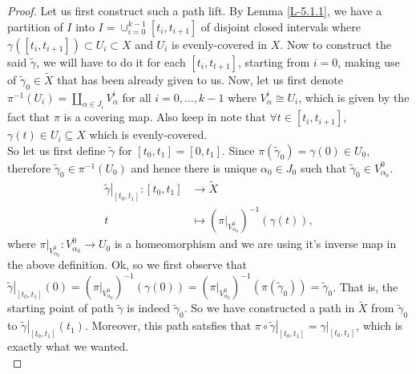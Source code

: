 \documentclass[letterpaper,11pt,twoside]{article}
\theoremstyle{definition}
\theoremstyle{definition}
\theoremstyle{definition}
\theoremstyle{definition}
\theoremstyle{definition}
\theoremstyle{definition}
\theoremstyle{remark}
\theoremstyle{definition}
\newcommand{\isom}{\cong}
\newcommand{\rest}[2]{\left. { #1 }\right \vert_{#2}}
\newcommand{\inv}[1]{\left(#1\right)^{-1}}
\begin{document}
\begin{proof}
Let us first construct such a path lift. By Lemma \ref{L-5.1.1}, we have a partition of $I$ into $I = \cup_{i=0}^{k-1} [t_i,t_{i+1}]$ of disjoint closed intervals where $\gamma ([t_i,t_{i+1}])\subset U_i\subset X$ and $U_i$ is evenly-covered in $X$. Now to construct the said $\tilde{\gamma}$, we will have to do it for each $[t_i, t_{t+1}]$, starting from $i=0$, making use of $\tilde{\gamma}_0 \in \tilde{X}$ that has been already given to us. Now, let us first denote $\pi^{-1}(U_i) = \coprod_{\alpha \in J_i} V_\alpha^i$ for all $i=0, \dots, k-1$ where $V_\alpha^i \isom U_i$, which is given by the fact that $\pi$ is a covering map. Also keep in note that $\forall t\in [t_i,t_{i+1}]$, $\gamma(t)\in U_i\subseteq X$ which is evenly-covered.\\ 

So let us first define $\tilde \gamma $ for $[t_0, t_1] = [0,t_1]$. Since $\pi(\tilde{\gamma}_0) = \gamma (0) \in U_0$, therefore $\tilde{\gamma}_0 \in \pi^{-1}(U_0)$ and hence there is unique $\alpha_0 \in J_0 $ such that $\tilde{\gamma}_0 \in V_{\alpha_0}^0$.
\begin{align*}
    \rest{\tilde \gamma}{[t_0,t_1]} : [t_0, t_1] &\longrightarrow \tilde{X}\\
    t&\longmapsto \inv{\rest{\pi}{V^0_{\alpha_0}}}(\gamma(t)),
\end{align*}
where $\rest{\pi}{V^0_{\alpha_0}} : V^0_{\alpha_0} \to U_0$ is a homeomorphism and we are using it's inverse map in the above definition. Ok, so we first observe that $\rest{\tilde{\gamma}}{[t_0,t_1]}(0) = \inv{\rest{\pi}{V^0_{\alpha_0}}}(\gamma(0)) = \inv{\rest{\pi}{V^0_{\alpha_0}}}(\pi(\tilde{\gamma}_0)) = \tilde{\gamma}_0$. That is, the starting point of path $\tilde{\gamma}$ is indeed $\tilde{\gamma}_0$. So we have constructed a path in $\tilde{X}$ from $\tilde{\gamma}_0$ to $\rest{\tilde{\gamma}}{[t_0,t_1]}(t_1)$. Moreover, this path satsfies that $\pi \circ \rest{\tilde\gamma}{[t_0,t_1]} = \rest{\gamma}{[t_0,t_1]}$, which is exactly what we wanted. \\


\end{proof}
\end{document}
